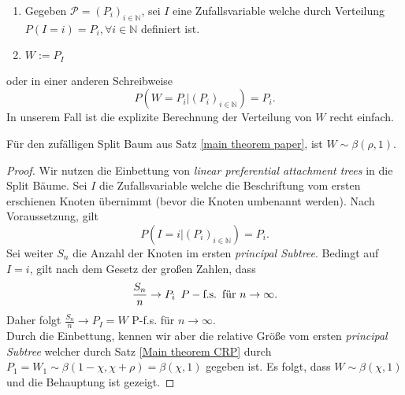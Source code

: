 \begin{enumerate}
    \item Gegeben $\mathcal{P} = (P_i)_{i \in \mathbb{N}}$, sei $I$ eine Zufallsvariable welche durch Verteilung $P(I=i) = P_i, \forall i \in \mathbb{N}$ definiert ist.
    \item $W:= P_I$ 
\end{enumerate}
oder in einer anderen Schreibweise
\[
    P(W = P_i| (P_i)_{i \in \mathbb{N}}) = P_i.
\]
In unserem Fall ist die explizite Berechnung der Verteilung von $W$ recht einfach.
\begin{theorem}
    Für den zufälligen Split Baum aus Satz \ref{main theorem paper}, ist $W \sim \beta(\rho,1)$.
\end{theorem} 
\begin{proof}
    Wir nutzen die Einbettung von \textit{linear preferential attachment trees} in die Split Bäume. Sei $I$ die Zufallsvariable welche die Beschriftung vom ersten erschienen Knoten übernimmt (bevor die Knoten umbenannt werden). Nach Voraussetzung, gilt 
    \[
    P(I=i|(P_i)_{i \in \mathbb{N}}) = P_i.  
    \] 
    Sei weiter $S_n$ die Anzahl der Knoten im ersten \textit{principal Subtree}. Bedingt auf $I=i$, gilt nach dem Gesetz der großen Zahlen, dass 
    \[
    \frac{S_n}{n} \rightarrow P_i \hspace{5pt} P-\textnormal{f.s.} \hspace{5pt} \textnormal{für } n \to \infty.
    \] 
    Daher folgt $\frac{S_n}{n} \rightarrow P_I = W$ P-f.s. für $n \to \infty$.\\
    Durch die Einbettung, kennen wir aber die relative Größe vom ersten \textit{principal Subtree} welcher durch Satz \ref{Main theorem CRP} durch $P_1 = W_1 \sim \beta(1-\chi,\chi + \rho) = \beta(\chi, 1)$ gegeben ist. Es folgt, dass $W \sim \beta(\chi,1)$ und die Behauptung ist gezeigt.
\end{proof}